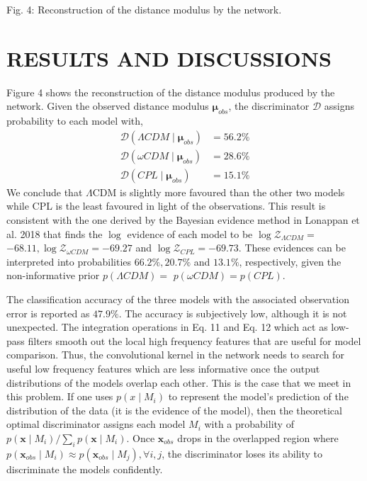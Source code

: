 \documentclass[10pt]{article}
\begin{document}
Fig. 4: Reconstruction of the distance modulus by the network.

\section{RESULTS AND DISCUSSIONS}
Figure 4 shows the reconstruction of the distance modulus produced by the network. Given the observed distance modulus $\boldsymbol{\mu}_{o b s}$, the discriminator $\mathcal{D}$ assigns probability to each model with,
$$
\begin{aligned}
\mathcal{D}\left(\Lambda C D M \mid \boldsymbol{\mu}_{o b s}\right) &=56.2 \% \\
\mathcal{D}\left(\omega C D M \mid \boldsymbol{\mu}_{o b s}\right) &=28.6 \% \\
\mathcal{D}\left(C P L \mid \boldsymbol{\mu}_{o b s}\right) &=15.1 \%
\end{aligned}
$$
We conclude that $\Lambda \mathrm{CDM}$ is slightly more favoured than the other two models while CPL is the least favoured in light of the observations. This result is consistent with the one derived by the Bayesian evidence method in Lonappan et al. 2018 that finds the $\log$ evidence of each model to be $\log \mathcal{Z}_{\Lambda C D M}=$ $-68.11, \log \mathcal{Z}_{\omega C D M}=-69.27$ and $\log \mathcal{Z}_{C P L}=-69.73$. These evidences can be interpreted into probabilities $66.2 \%, 20.7 \%$ and $13.1 \%$, respectively, given the non-informative prior $p(\Lambda C D M)=$ $p(\omega C D M)=p(C P L) .$

The classification accuracy of the three models with the associated observation error is reported as $47.9 \%$. The accuracy is subjectively low, although it is not unexpected. The integration operations in Eq. 11 and Eq. 12 which act as low-pass filters smooth out the local high frequency features that are useful for model comparison. Thus, the convolutional kernel in the network needs to search for useful low frequency features which are less informative once the output distributions of the models overlap each other. This is the case that we meet in this problem. If one uses $p\left(x \mid M_{i}\right)$ to represent the model's prediction of the distribution of the data (it is the evidence of the model), then the theoretical optimal discriminator assigns each model $M_{i}$ with a probability of $p\left(\boldsymbol{x} \mid M_{i}\right) / \sum_{i} p\left(\boldsymbol{x} \mid M_{i}\right)$. Once $\boldsymbol{x}_{o b s}$ drops in the overlapped region where $p\left(\boldsymbol{x}_{o b s} \mid M_{i}\right) \approx p\left(\boldsymbol{x}_{o b s} \mid M_{j}\right), \forall i, j$, the discriminator loses its ability to discriminate the models confidently.
\end{document}
